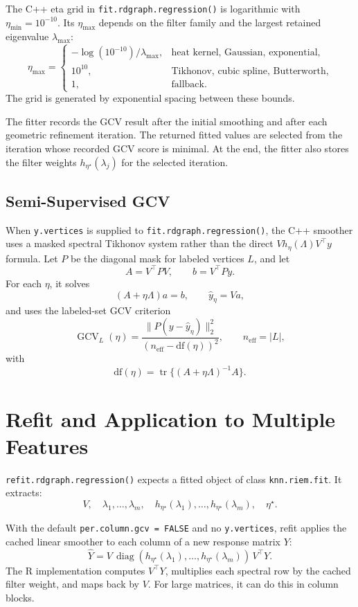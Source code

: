 \documentclass[11pt]{article}
\newcommand{\code}[1]{\texttt{#1}}
\newcommand{\diag}{\operatorname{diag}}
\newcommand{\tr}{\operatorname{tr}}
\begin{document}
The C++ eta grid in \code{fit.rdgraph.regression()} is logarithmic with
\(\eta_{\min}=10^{-10}\). Its \(\eta_{\max}\) depends on the filter family and
the largest retained eigenvalue \(\lambda_{\max}\):
\[
  \eta_{\max}
  =
  \begin{cases}
  -\log(10^{-10})/\lambda_{\max},&
    \text{heat kernel, Gaussian, exponential},\\
  10^{10},&
    \text{Tikhonov, cubic spline, Butterworth},\\
  1,&
    \text{fallback}.
  \end{cases}
\]
The grid is generated by exponential spacing between these bounds.

The fitter records the GCV result after the initial smoothing and after each
geometric refinement iteration. The returned fitted values are selected from
the iteration whose recorded GCV score is minimal. At the end, the fitter also
stores the filter weights \(h_{\eta^\star}(\lambda_j)\) for the selected
iteration.

\subsection{Semi-Supervised GCV}

When \code{y.vertices} is supplied to \code{fit.rdgraph.regression()}, the C++
smoother uses a masked spectral Tikhonov system rather than the direct
\(Vh_\eta(\Lambda)V^\top y\) formula. Let \(P\) be the diagonal mask for
labeled vertices \(L\), and let
\[
  A = V^\top P V,\qquad b=V^\top P y.
\]
For each \(\eta\), it solves
\[
  (A+\eta\Lambda)a=b,
  \qquad
  \hat y_\eta = Va,
\]
and uses the labeled-set GCV criterion
\[
  \operatorname{GCV}_L(\eta)
  =
  \frac{\|P(y-\hat y_\eta)\|_2^2}
       {(n_{\mathrm{eff}}-\mathrm{df}(\eta))^2},
  \qquad
  n_{\mathrm{eff}}=|L|,
\]
with
\[
  \mathrm{df}(\eta)
    =
    \tr\{(A+\eta\Lambda)^{-1}A\}.
\]

\section{Refit and Application to Multiple Features}

\code{refit.rdgraph.regression()} expects a fitted object of class
\code{knn.riem.fit}. It extracts:
\[
  V,\quad
  \lambda_1,\ldots,\lambda_m,\quad
  h_{\eta^\star}(\lambda_1),\ldots,h_{\eta^\star}(\lambda_m),\quad
  \eta^\star.
\]

With the default \code{per.column.gcv = FALSE} and no \code{y.vertices}, refit
applies the cached linear smoother to each column of a new response matrix
\(Y\):
\[
  \widehat Y
  =
  V\,\diag(h_{\eta^\star}(\lambda_1),\ldots,h_{\eta^\star}(\lambda_m))\,V^\top Y.
\]
The R implementation computes \(V^\top Y\), multiplies each spectral row by the
cached filter weight, and maps back by \(V\). For large matrices, it can do this
in column blocks.
\end{document}
